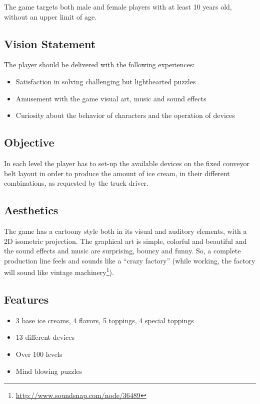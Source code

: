 \documentclass[a4paper]{scrartcl}
\begin{document}
    The game targets both male and female players with at least 10 years old, without an upper limit of age.
    
    \subsection{Vision Statement}
    	The player should be delivered with the following experiences:
    	\begin{itemize}
    		\item Satisfaction in solving challenging but lighthearted puzzles
    		\item Amusement with the game visual art, music and sound effects
    		\item Curiosity about the behavior of characters and the operation of devices
    	\end{itemize}

	\subsection{Objective}
		In each level the player has to set-up the available devices on the fixed conveyor belt layout in order to produce the amount of ice cream, in their different combinations, as requested by the truck driver.
		
	\subsection{Aesthetics}
		The game has a cartoony style both in its visual and auditory elements, with a 2D isometric projection. The graphical art is simple, colorful and beautiful and the sound effects and music are surprising, bouncy and funny. So, a complete production line feels and sounds like a ``crazy factory'' (while working, the factory will sound like vintage machinery\footnote{\url{http://www.soundsnap.com/node/36489}}).
		
	\subsection{Features}
	    \begin{itemize}
	        \item 3 base ice creams, 4 flavors, 5 toppings, 4 special toppings
	        \item 13 different devices
	        \item Over 100 levels
	        \item Mind blowing puzzles
	    \end{itemize}
	
\end{document}
